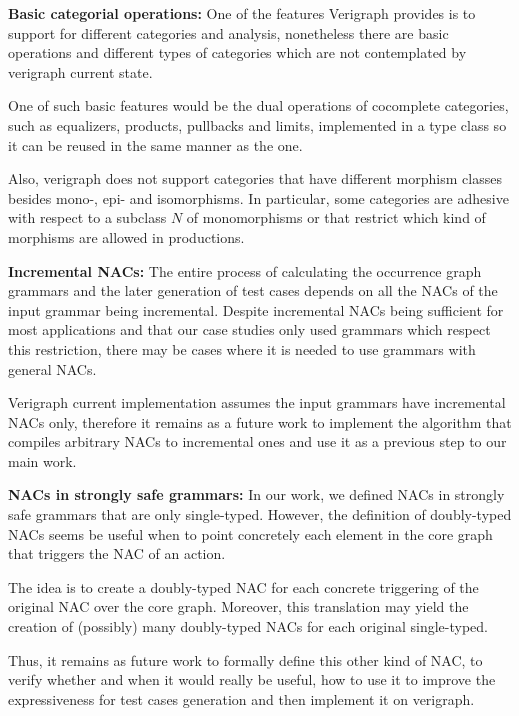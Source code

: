 
\textbf{Basic categorial operations:} One of the features Verigraph provides is to support for different categories and analysis, nonetheless there are basic operations and different types of categories which are not contemplated by verigraph current state.

One of such basic features would be the dual operations of cocomplete categories, such as equalizers, products, pullbacks and limits, implemented in a  type class so it can be reused in the same manner as the  one.

Also, verigraph does not support categories that have different morphism classes besides mono-, epi- and isomorphisms. In particular, some categories are adhesive with respect to a subclass $N$ of monomorphisms or that restrict which kind of morphisms are allowed in productions.

\textbf{Incremental NACs:} The entire process of calculating the occurrence graph grammars and the later generation of test cases depends on all the NACs of the input grammar being incremental. Despite incremental NACs being sufficient for most applications and that our case studies only used grammars which respect this restriction, there may be cases where it is needed to use grammars with general NACs.

  Verigraph current implementation assumes the input grammars have incremental NACs only, therefore it remains as a future work to implement the algorithm that compiles arbitrary NACs to incremental ones and use it as a previous step to our main work.

\textbf{NACs in strongly safe grammars:} In our work, we defined NACs in strongly safe grammars that are only single-typed. However, the definition of doubly-typed NACs seems be useful when to point concretely each element in the core graph that triggers the NAC of an action.

The idea is to create a doubly-typed NAC for each concrete triggering of the original NAC over the core graph. Moreover, this translation may yield the creation of (possibly) many doubly-typed NACs for each original single-typed. 

Thus, it remains as future work to formally define this other kind of NAC, to verify whether and when it would really be useful, how to use it to improve the expressiveness for test cases generation and then implement it on verigraph.

